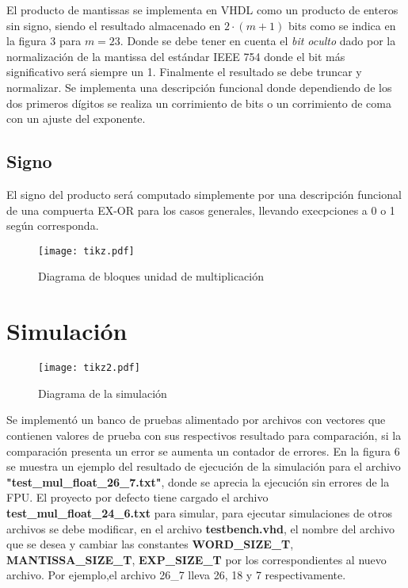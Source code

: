 \documentclass[a4paper, 10pt, spanish]{article}
\numberwithin{equation}{section}
\numberwithin{table}{section}
\begin{document}
El producto de mantissas se implementa en VHDL como un producto de enteros sin signo, siendo el resultado almacenado en $2\cdot(m+1)$ bits como se indica en la figura 3 para $m = 23$. Donde se debe tener en cuenta el \textit{bit oculto} dado por la normalización de la mantissa del estándar IEEE 754 donde el bit más significativo será siempre un 1. Finalmente el resultado se debe truncar y normalizar. Se implementa una descripción funcional donde dependiendo de los dos primeros dígitos se realiza un corrimiento de bits o un corrimiento de coma con un ajuste del exponente.

\subsection{Signo}
El signo del producto será computado simplemente por una descripción funcional de una compuerta EX-OR para los casos generales, llevando execpciones a 0 o 1 según corresponda.

\vspace{3cm}
\begin{figure}[h!]
\begin{center}
    \hspace{2cm}
    \texttt{[image: tikz.pdf]}
\end{center}
\caption{Diagrama de bloques unidad de multiplicación}
\end{figure}

\newpage
\section{Simulación}
\begin{figure}[h!]
\begin{center}
    \hspace{2cm}
    \texttt{[image: tikz2.pdf]}
\end{center}
\caption{Diagrama de la simulación}
\end{figure}
Se implementó un banco de pruebas alimentado por archivos con vectores que contienen valores de prueba con sus respectivos resultado para comparación, si la comparación presenta un error se aumenta un contador de errores. En la figura 6 se muestra un ejemplo del resultado de ejecución de la simulación para el archivo \textbf{"test\_mul\_float\_26\_7.txt"}, donde se aprecia la ejecución sin errores de la FPU. El proyecto por defecto tiene cargado el archivo \textbf{test\_mul\_float\_24\_6.txt} para simular, para ejecutar simulaciones de otros archivos se debe modificar, en el archivo \textbf{testbench.vhd}, el nombre del archivo que se desea y cambiar las constantes \textbf{WORD\_SIZE\_T}, \textbf{MANTISSA\_SIZE\_T}, \textbf{EXP\_SIZE\_T} por los correspondientes al nuevo archivo. Por ejemplo,el archivo 26\_7 lleva 26, 18 y 7 respectivamente.
 
\end{document}
